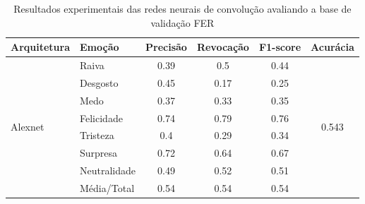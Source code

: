 \begin{table}[]
\centering
\caption{Resultados experimentais das redes neurais de convolução avaliando a base de validação FER}
\label{table:fer}
\begin{tabular}{llcccc}
\hline
\textbf{Arquitetura}                   & \textbf{Emoção}       & \multicolumn{1}{l}{\textbf{Precisão}} & \multicolumn{1}{l}{\textbf{Revocação}} & \multicolumn{1}{l}{\textbf{F1-score}} & \multicolumn{1}{l}{\textbf{Acurácia}} \\ \hline
\multirow{8}{*}{Alexnet}         & Raiva                 & 0.39                                  & 0.5                                    & 0.44                                  & \multirow{8}{*}{0.543}                \\
                                       & Desgosto              & 0.45                                  & 0.17                                   & 0.25                                  &                                       \\
                                       & Medo                  & 0.37                                  & 0.33                                   & 0.35                                  &                                       \\
                                       & Felicidade            & 0.74                                  & 0.79                                   & 0.76                                  &                                       \\
                                       & Tristeza              & 0.4                                   & 0.29                                   & 0.34                                  &                                       \\
                                       & Surpresa              & 0.72                                  & 0.64                                   & 0.67                                  &                                       \\
                                       & Neutralidade          & 0.49                                  & 0.52                                   & 0.51                                  &                                       \\
                                       & Média/Total           & 0.54                                  & 0.54                                   & 0.54                                  &                                       \\ \hline

\end{tabular}
\end{table}
